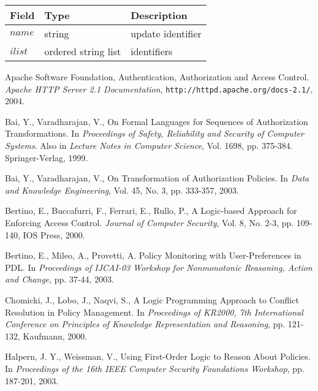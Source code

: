 \documentclass[global,twocolumn,draft]{svjour}
\newenvironment{vquote}
  {\begin{list}{}{\leftmargin 1em}\item[]}
  {\end{list}}
\begin{document}
      \begin{vquote}
        \begin{tabular}[t]{|l|l|l|}
          \hline
          \textbf{Field} & \textbf{Type} & \textbf{Description} \\
          \hline
          $name$ & string & update identifier \\
          \hline
          $ilist$ & ordered string list & identifiers \\
          \hline
        \end{tabular}
      \end{vquote}

  \begin{thebibliography}{5}
      Apache Software Foundation,
      Authentication, Authorization and Access Control.
      {\em Apache HTTP Server 2.1 Documentation},
      {\tt \scriptsize http://httpd.apache.org/docs-2.1/}, 2004.

      Bai, Y., Varadharajan, V.,
      On Formal Languages for Sequences of Authorization Transformations.
      In {\em Proceedings of Safety, Reliability and Security of Computer
      Systems}. Also in {\em Lecture Notes in Computer Science},
      Vol. 1698, pp. 375-384. Springer-Verlag, 1999.

      Bai, Y., Varadharajan, V.,
      On Transformation of Authorization Policies.
      In {\em Data and Knowledge Engineering},
      Vol. 45, No. 3, pp. 333-357, 2003.

      Bertino, E., Buccafurri, F., Ferrari, E., Rullo, P.,
      A Logic-based Approach for Enforcing Access Control.
      {\em Journal of Computer Security},
      Vol. 8, No. 2-3, pp. 109-140, IOS Press, 2000.

      Bertino, E., Mileo, A., Provetti, A.
      Policy Monitoring with User-Preferences in PDL.
      In {\em Proceedings of IJCAI-03 Workshop for Nonmonotonic Reasoning,
      Action and Change},
      pp. 37-44, 2003.

      Chomicki, J., Lobo, J., Naqvi, S.,
      A Logic Programming Approach to Conflict Resolution in Policy Management.
      In {\em Proceedings of KR2000, 7th International Conference on Principles
      of Knowledge Representation and Reasoning},
      pp. 121-132, Kaufmann, 2000.

      Halpern, J. Y., Weissman, V.,
      Using First-Order Logic to Reason About Policies.
      In {\em Proceedings of the 16th IEEE Computer Security Foundations
      Workshop}, pp. 187-201, 2003.


\end{thebibliography}
\end{document}
